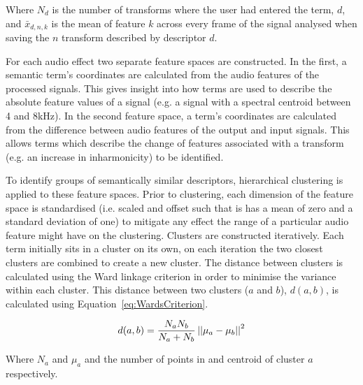 		Where $N_{d}$ is the number of transforms where the user had entered the term, $d$, and $\bar{x}_{d,n,k}$
		is the mean of feature $k$ across every frame of the signal analysed when saving the $n$
		transform described by descriptor $d$.
		
		For each audio effect two separate feature spaces are constructed. In the first, a semantic term's
		coordinates are calculated from the audio features of the processed signals. This gives insight into how
		terms are used to describe the absolute feature values of a signal (e.g. a signal with a spectral centroid
		between 4 and 8kHz). In the second feature space, a term's coordinates are calculated from the difference
		between audio features of the output and input signals. This allows terms which describe the change of
		features associated with a transform (e.g. an increase in inharmonicity) to be identified.

		To identify groups of semantically similar descriptors, hierarchical clustering is applied to these feature
		spaces. Prior to clustering, each dimension of the feature space is standardised (i.e. scaled and offset
		such that is has a mean of zero and a standard deviation of one) to mitigate any effect the range of a
		particular audio feature might have on the clustering. Clusters are constructed iteratively. Each term
		initially sits in a cluster on its own, on each iteration the two closest clusters are combined to create a
		new cluster. The distance between clusters is calculated using the Ward linkage criterion
		\citep{ward1963hierarchical} in order to minimise the variance within each cluster. This distance between
		two clusters ($a$ and $b$), $d(a, b)$, is calculated using Equation~\ref{eq:WardsCriterion}.

		\begin{equation}
			d(a, b) = \frac{N_{a}N_{b}}{N_{a} + N_{b}} \left|\left|\mu_{a} - \mu_{b}\right|\right|^{2}
			\label{eq:WardsCriterion}
		\end{equation}

		Where $N_{a}$ and $\mu_{a}$ and the number of points in and centroid of cluster $a$ respectively.

